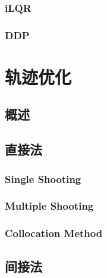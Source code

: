 \subsection{iLQR}
\subsection{DDP}

\chapter{轨迹优化}
\section{概述}
\section{直接法}
\subsection{Single Shooting}
\subsection{Multiple Shooting}
\subsection{Collocation Method}
\section{间接法}





